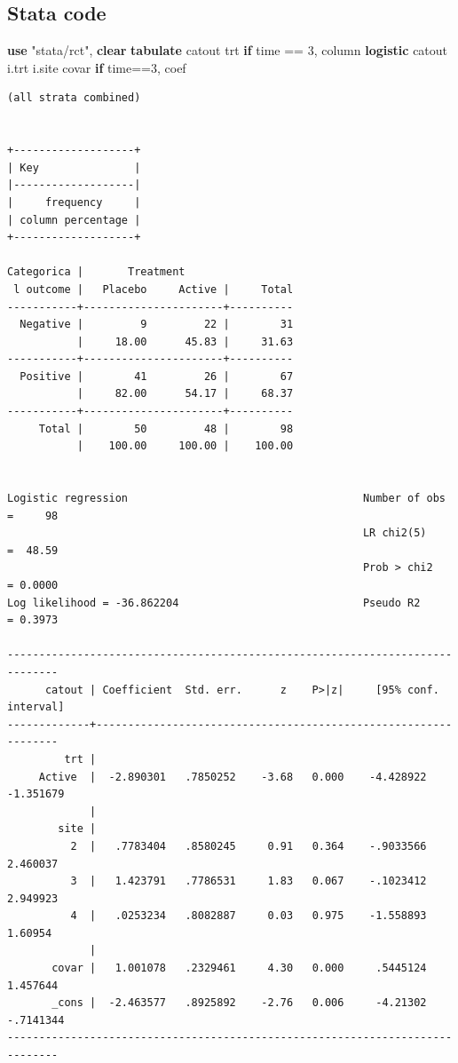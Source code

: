 \documentclass[
]{book}
\newenvironment{Shaded}{\begin{snugshade}}{\end{snugshade}}
\newcommand{\KeywordTok}[1]{\textcolor[rgb]{0.13,0.29,0.53}{\textbf{#1}}}
\newcommand{\NormalTok}[1]{#1}
\newcommand{\StringTok}[1]{\textcolor[rgb]{0.31,0.60,0.02}{#1}}
\begin{document}
\subsection{Stata code}\label{stata-code-1}

\begin{Shaded}
\begin{Highlighting}[]
\KeywordTok{use} \StringTok{"stata/rct"}\NormalTok{, }\KeywordTok{clear} 
\KeywordTok{tabulate}\NormalTok{ catout trt }\KeywordTok{if}\NormalTok{ time == 3, column}
\KeywordTok{logistic}\NormalTok{ catout i.trt i.site covar  }\KeywordTok{if}\NormalTok{ time==3, coef}
\end{Highlighting}
\end{Shaded}

\begin{verbatim}
(all strata combined)


+-------------------+
| Key               |
|-------------------|
|     frequency     |
| column percentage |
+-------------------+

Categorica |       Treatment
 l outcome |   Placebo     Active |     Total
-----------+----------------------+----------
  Negative |         9         22 |        31 
           |     18.00      45.83 |     31.63 
-----------+----------------------+----------
  Positive |        41         26 |        67 
           |     82.00      54.17 |     68.37 
-----------+----------------------+----------
     Total |        50         48 |        98 
           |    100.00     100.00 |    100.00 


Logistic regression                                     Number of obs =     98
                                                        LR chi2(5)    =  48.59
                                                        Prob > chi2   = 0.0000
Log likelihood = -36.862204                             Pseudo R2     = 0.3973

------------------------------------------------------------------------------
      catout | Coefficient  Std. err.      z    P>|z|     [95% conf. interval]
-------------+----------------------------------------------------------------
         trt |
     Active  |  -2.890301   .7850252    -3.68   0.000    -4.428922   -1.351679
             |
        site |
          2  |   .7783404   .8580245     0.91   0.364    -.9033566    2.460037
          3  |   1.423791   .7786531     1.83   0.067    -.1023412    2.949923
          4  |   .0253234   .8082887     0.03   0.975    -1.558893     1.60954
             |
       covar |   1.001078   .2329461     4.30   0.000     .5445124    1.457644
       _cons |  -2.463577   .8925892    -2.76   0.006     -4.21302   -.7141344
------------------------------------------------------------------------------
\end{verbatim}
\end{document}
